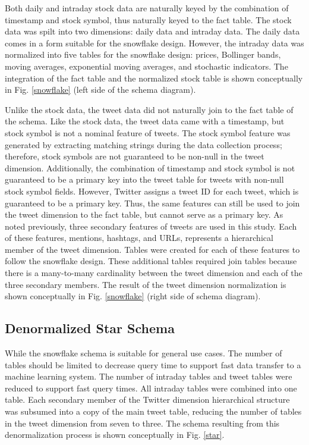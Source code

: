 \documentclass[journal]{IEEEtran}
\begin{document}
	Both daily and intraday stock data are naturally keyed by the
	combination of timestamp and stock symbol,
	thus naturally keyed to the fact table.
	The stock data was spilt into two dimensions: daily data and intraday data.
	The daily data comes in a form suitable for the snowflake design.
	However, the intraday data was normalized into five tables for the 
	snowflake design: prices, Bollinger bands, moving averages, exponential
	moving averages, and stochastic indicators.
	The integration of the fact table and the normalized stock table is shown
	conceptually in Fig. \ref{snowflake} (left side of the schema diagram).
	
	Unlike the stock data, the tweet data did not naturally join to the fact
	table of the schema.
	Like the stock data, the tweet data came with a timestamp, but stock symbol
	is not a nominal feature of tweets.
	The stock symbol feature was generated by extracting matching strings
	during the data collection process; therefore, stock symbols are not
	guaranteed to be non-null in the tweet dimension.
	Additionally, the combination of timestamp and stock symbol is not guaranteed
	to be a primary key into the tweet table for tweets with non-null stock symbol
	fields.
	However, Twitter assigns a tweet ID for each tweet, which is guaranteed to be
	a primary key.
	Thus, the same features can still be used to join the tweet dimension to the 
	fact table, but cannot serve as a primary key.
	As noted previously, three secondary features of tweets are used in this study.
	Each of these features, mentions, hashtags, and URLs, represents a hierarchical
	member of the tweet dimension.
	Tables were created for each of these features to follow the snowflake design.
	These additional tables required join tables because there is a many-to-many
	cardinality between the tweet dimension and each of the three secondary members.
	The result of the tweet dimension normalization is shown conceptually
	in Fig. \ref{snowflake} (right side of schema diagram).
	
	\subsection{Denormalized Star Schema}
	
	While the snowflake schema is suitable for general use cases.
	The number of tables should be limited to decrease query time to support
	fast data transfer to a machine learning system.
	The number of intraday tables and tweet tables were reduced to support
	fast query times.
	All intraday tables were combined into one table. 
	Each secondary member of the Twitter dimension hierarchical structure was
	subsumed into a copy of the main tweet table, reducing the number of tables
	in the tweet dimension from seven to three.
	The schema resulting from this denormalization process is shown
	conceptually in Fig. \ref{star}.
	
\end{document}

